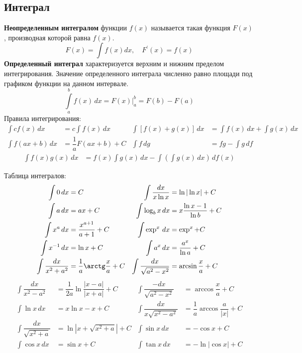 \subsection{Интеграл}
\textbf{Неопределенным интегралом} функции $f(x)$ называется такая функция $F(x)$, производная которой равна $f(x)$.
\begin{equation}
F(x) = \int f(x)dx,\quad F^\prime(x)=f(x)
\end{equation}
\textbf{Определенный интеграл} характеризуется верхним и нижним пределом интегрирования. Значение определенного интеграла численно равно площади под графиком функции на данном интервале.
\begin{equation}
\int\limits^b_a f(x)\,dx = \left. F(x) \right|^b_a = F(b) - F(a)
\end{equation}
Правила интегрирования:
\begin{align*}
\int c f(x) \,dx &= c \int f(x) \,dx & \int \left[f(x) + g(x)\right] \,dx &= \int f(x) \,dx + \int g(x) \,dx\\
\int f(ax + b) \,dx &= \dfrac{1}{a}F(ax + b) + C & \int f \,dg &= fg - \int g \,df
\end{align*}
\begin{align*}
\int f(x) g(x) \,dx &= f(x) \int g(x) \,dx - \int\left(\int g(x) \,dx \right) \,df(x) 
\end{align*}

Таблица интегралов:
\begin{align*}
\int 0 \,dx &= C & \int \dfrac{dx}{x \ln x} &= \ln |\ln x| + C \\
\int a \,dx &= ax + C & \int \log_b x \,dx &= x\dfrac{\ln x - 1}{\ln b} + C\\
\int x^a \,dx &= \dfrac{x^{a+1}}{a+1} + C & \int \exp^x \,dx &= \exp^x + C \\
\int x^{-1} \,dx &= \ln x + C & \int a^x \,dx &= \dfrac{a^x}{\ln a} + C\\
\int \dfrac{dx}{x^2 + a^2} &= \dfrac{1}{a} \arctg \dfrac{x}{a} + C & \int \dfrac{dx}{\sqrt{a^2 - x^2}} &= \arcsin\dfrac{x}{a} + C\\
\end{align*}
\begin{align*}
\int \dfrac{dx}{x^2 - a^2} &= \dfrac{1}{2a} \ln \dfrac{|x - a|}{|x + a|} + C & \int \dfrac{-dx}{\sqrt{a^2 - x^2}} &= \arccos\dfrac{x}{a} + C\\
\int \ln x \,dx &= x \ln x - x + C & \int \dfrac{dx}{x \sqrt{x^2 - a^2}} &= \dfrac{1}{a}\arccos\dfrac{a}{|x|} + C\\
\int \dfrac{dx}{\sqrt{x^2 + a}} &= \ln|x + \sqrt{x^2 + a}| + C & \int \sin x \,dx &= -\cos x + C\\
\int \cos x \,dx &= \sin x + C & \int \tan x \,dx &= - \ln|\cos x| + C
\end{align*}
